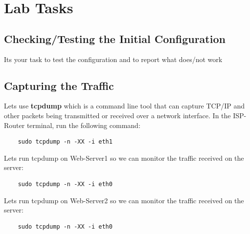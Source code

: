 \section{Lab Tasks}

\subsection{Checking/Testing the Initial Configuration}\label{Checking/Testing the Initial Configuration}
Its your task to test the configuration and to report what does/not work


\subsection{Capturing the Traffic}
Lets use \textbf{tcpdump} which is a command line tool that can capture TCP/IP and other packets being transmitted or received over a network interface.
\newline
\newline
In the ISP-Router terminal, run the following command:
\begin{verbatim}
    sudo tcpdump -n -XX -i eth1
\end{verbatim}

Lets run tcpdump on Web-Server1 so we can monitor the traffic received on the server:
\begin{verbatim}
    sudo tcpdump -n -XX -i eth0
\end{verbatim}

Lets run tcpdump on Web-Server2 so we can monitor the traffic received on the server:
\begin{verbatim}
    sudo tcpdump -n -XX -i eth0
\end{verbatim}

